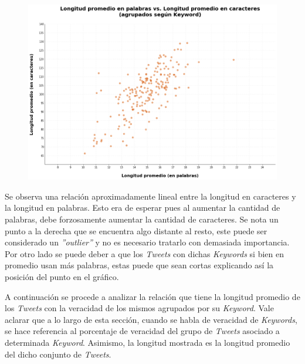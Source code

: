 \documentclass[titlepage,a4paper]{article}
\begin{document}
    \begin{figure}[H]
    \centering
    \includegraphics[width=1\textwidth]{graficos/Analisis de Keyword/long_prom_en_palabras_vs_long_prom_en_Caracteres.png}
    \caption{} 
    \end{figure}
    Se observa una relación aproximadamente lineal entre la longitud en caracteres y la longitud en palabras. Esto era de esperar pues al aumentar la cantidad de palabras, debe forzosamente aumentar la cantidad de caracteres. Se nota un punto a la derecha que se encuentra algo distante al resto, este puede ser considerado un \textit{''outlier''} y no es necesario tratarlo con demasiada importancia. Por otro lado se puede deber a que los \textit{Tweets} con dichas \textit{Keywords} si bien en promedio usan más palabras, estas puede que sean cortas explicando así la posición del punto en el gráfico. 
    
    A continuación se procede a analizar la relación que tiene la longitud promedio de los \textit{Tweets} con la veracidad de los mismos agrupados por su \textit{Keyword}. Vale aclarar que a lo largo de esta sección, cuando se habla de veracidad de \textit{Keywords}, se hace referencia al porcentaje de veracidad del grupo de \textit{Tweets} asociado a determinada \textit{Keyword}. Asimismo, la longitud mostrada es la longitud promedio del dicho conjunto de \textit{Tweets}. 
    
\end{document}
